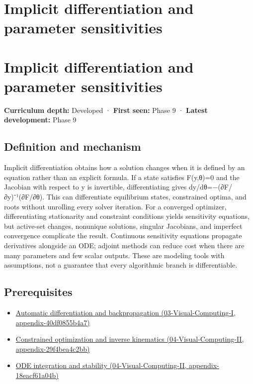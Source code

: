 \hypertarget{appendix-8836553d56fc}{}
\section*{Implicit differentiation and parameter sensitivities}
\section{Implicit differentiation and parameter sensitivities}\label{appendix-8836553d56fc-implicit-differentiation-and-parameter-sensitivities}

\textbf{Curriculum depth:} Developed · \textbf{First seen:} Phase 9 · \textbf{Latest development:} Phase 9

\subsection{Definition and mechanism}\label{appendix-8836553d56fc-definition-and-mechanism}

Implicit differentiation obtains how a solution changes when it is defined by an equation rather than an explicit formula. If a state satisfies F(y,θ)=0 and the Jacobian with respect to y is invertible, differentiating gives dy/dθ=−(∂F/∂y)⁻¹(∂F/∂θ). This can differentiate equilibrium states, constrained optima, and roots without unrolling every solver iteration. For a converged optimizer, differentiating stationarity and constraint conditions yields sensitivity equations, but active-set changes, nonunique solutions, singular Jacobians, and imperfect convergence complicate the result. Continuous sensitivity equations propagate derivatives alongside an ODE; adjoint methods can reduce cost when there are many parameters and few scalar outputs. These are modeling tools with assumptions, not a guarantee that every algorithmic branch is differentiable.

\subsection{Prerequisites}\label{appendix-8836553d56fc-prerequisites}

\begin{itemize}
\tightlist
\item
  \href{../03-Visual-Computing-I/main.pdf\#nameddest=appendix-40df0855b4a7}{Automatic differentiation and backpropagation (03-Visual-Computing-I, appendix-40df0855b4a7)}
\item
  \href{../04-Visual-Computing-II/main.pdf\#nameddest=appendix-29f4bea4c2bb}{Constrained optimization and inverse kinematics (04-Visual-Computing-II, appendix-29f4bea4c2bb)}
\item
  \href{../04-Visual-Computing-II/main.pdf\#nameddest=appendix-18eacf61a04b}{ODE integration and stability (04-Visual-Computing-II, appendix-18eacf61a04b)}
\end{itemize}

